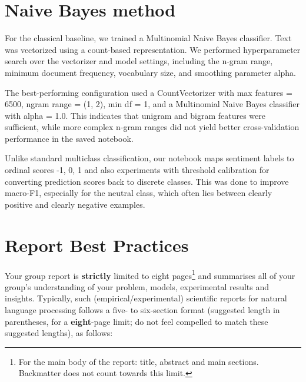 \documentclass[11pt]{article}
\begin{document}
\section{Naive Bayes method}

For the classical baseline, we trained a Multinomial Naive Bayes classifier. Text was vectorized using a count-based representation. We performed hyperparameter search over the vectorizer and model settings, including the n-gram range, minimum document frequency, vocabulary size, and smoothing parameter alpha.

The best-performing configuration used a CountVectorizer with max features = 6500, ngram range = (1, 2), min df = 1, and a Multinomial Naive Bayes classifier with alpha = 1.0. This indicates that unigram and bigram features were sufficient, while more complex n-gram ranges did not yield better cross-validation performance in the saved notebook.

Unlike standard multiclass classification, our notebook maps sentiment labels to ordinal scores {-1, 0, 1} and also experiments with threshold calibration for converting prediction scores back to discrete classes. This was done to improve macro-F1, especially for the neutral class, which often lies between clearly positive and clearly negative examples.




\section{Report Best Practices}
\label{s:best}

Your group report is {\bf strictly} limited to eight pages\footnote{For the main body of the report: title, abstract and main sections. Backmatter does not count towards this limit.} and summarises all of your group's understanding of your problem, models, experimental results and insights.  Typically, such (empirical/experimental) scientific reports for natural language processing follows a five- to six-section format ({}suggested length in parentheses, for a {\bf eight}-page limit; do not feel compelled to match these suggested lengths), as follows:
\end{document}

